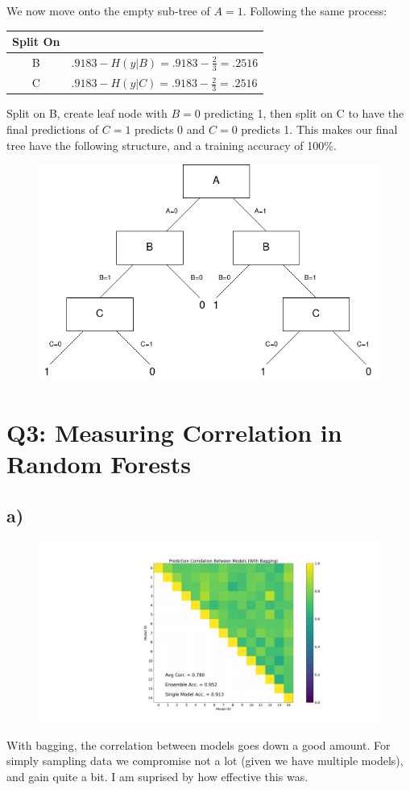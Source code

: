 \documentclass{article}
\begin{document}
        \qquad We now move onto the empty sub-tree of $A=1$. 
        Following the same process:
        \begin{center}
            \begin{tabular}{c | l}
                Split On & \\
                \hline
                B & $.9183 - H(y | B) = .9183 - \frac{2}{3} = .2516$\\
                C & $.9183 - H(y | C) = .9183 - \frac{2}{3} = .2516$\\
            \end{tabular}
        \end{center}
        \qquad Split on B, create leaf node with $B=0$ predicting 1, then split on C to have the final predictions of $C=1$ predicts 0 and $C=0$ predicts 1. 
        This makes our final tree have the following structure, and a training accuracy of 100\%. 
        \begin{figure}[h]
            \centering
            \includegraphics[width=.5\textwidth]{"Q2_2.png"}
        \end{figure}
        \clearpage


    \section*{Q3: Measuring Correlation in Random Forests}
        \subsection*{a)}
            \begin{figure}[h]
                \centering
                \includegraphics[width=\textwidth]{"with_bagging.png"}
            \end{figure}
        \qquad With bagging, the correlation between models goes down a good amount. For simply sampling data we compromise not a lot (given we have multiple models), and gain quite a bit. I am suprised by how effective this was.
\end{document}
